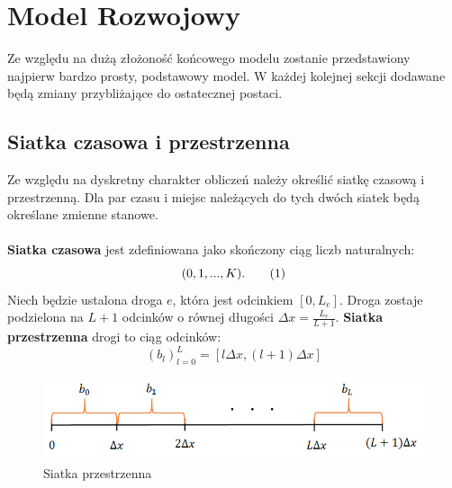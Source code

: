 \documentclass[12pt]{book}
\newcommand\addtag{\refstepcounter{equation}
\tag{\theequation}}
\begin{document}
\section{Model Rozwojowy}
Ze względu na dużą złożoność końcowego modelu zostanie przedstawiony najpierw bardzo prosty, podstawowy model. W każdej kolejnej sekcji dodawane będą zmiany przybliżające do ostatecznej postaci.
\subsection{Siatka czasowa i przestrzenna}
Ze względu na dyskretny charakter obliczeń należy określić siatkę czasową i przestrzenną. Dla par czasu i miejsc należących do tych dwóch siatek będą określane zmienne stanowe. \\ \\ \textbf{Siatka czasowa} jest zdefiniowana jako skończony ciąg liczb naturalnych:
\[(0,1,...,K). \addtag \]
Niech będzie ustalona droga $e$, która jest odcinkiem $[0,L_e]$. Droga zostaje podzielona na $L+1$ odcinków o równej długości $\Delta x=\frac{L_e}{L+1}$. \textbf{Siatka przestrzenna} drogi to ciąg odcinków:
\[(b_l)_{l=0}^{L}=[l\Delta x,(l+1)\Delta x]\]
\begin{figure}[H]
  \centering
    \includegraphics[width=14cm]{siatka_przestrzenna}
 \caption{Siatka przestrzenna}
 \label{fig:siatka_przestrzenna}
\end{figure}

\end{document}
